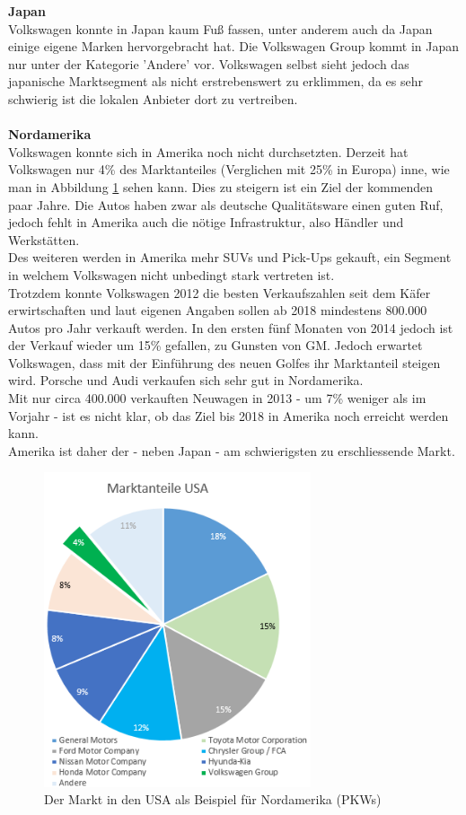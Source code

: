 \documentclass[12pt]{article}
\begin{document}
\noindent
\textbf{Japan} \\
Volkswagen konnte in Japan kaum Fuß fassen, unter anderem auch da Japan einige eigene Marken hervorgebracht hat.  Die Volkswagen Group kommt in Japan nur unter der Kategorie 'Andere' vor. Volkswagen selbst sieht jedoch das japanische Marktsegment als nicht erstrebenswert zu erklimmen, da es sehr schwierig ist die lokalen Anbieter dort zu vertreiben.
\\\\
\textbf{Nordamerika}\\
Volkswagen konnte sich in Amerika noch nicht durchsetzten. Derzeit hat Volkswagen nur 4\% des Marktanteiles (Verglichen mit 25\% in Europa) inne, wie man in Abbildung \ref{fig:marktnordamerika} sehen kann. Dies zu steigern ist ein Ziel der kommenden paar Jahre. Die Autos haben zwar als deutsche Qualitätsware einen guten Ruf, jedoch fehlt in Amerika auch die nötige Infrastruktur, also Händler und Werkstätten. \\ Des weiteren werden in Amerika mehr SUVs und Pick-Ups gekauft, ein Segment in welchem Volkswagen nicht unbedingt stark vertreten ist.\\
Trotzdem konnte Volkswagen 2012 die besten Verkaufszahlen seit dem Käfer erwirtschaften und laut eigenen Angaben sollen ab 2018 mindestens 800.000 Autos pro Jahr verkauft werden. In den ersten fünf Monaten von 2014 jedoch ist der Verkauf wieder um 15\% gefallen, zu Gunsten von GM. Jedoch erwartet Volkswagen, dass mit der Einführung des neuen Golfes ihr Marktanteil steigen wird. Porsche und Audi verkaufen sich sehr gut in Nordamerika. \cite{vwamstrategiechina} \\
Mit nur circa 400.000 verkauften Neuwagen in 2013 - um 7\% weniger als im Vorjahr - ist es nicht klar, ob das Ziel bis 2018 in Amerika noch erreicht werden kann.\cite{ec1}\\
Amerika ist daher der - neben Japan - am schwierigsten zu erschliessende Markt.
\begin{figure}[here!]
\centering
\includegraphics[width=0.7\textwidth]{images/maam}
\caption{Der Markt in den USA als Beispiel für Nordamerika (PKWs)}
\label{fig:marktnordamerika}
\end{figure}\FloatBarrier
\end{document}
